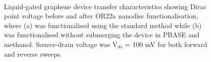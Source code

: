 \documentclass[
  a4paper,
]{scrbook}
\begin{document}
\begin{figure}
\begin{minipage}[t]{0.45\linewidth}
{{}

}

\end{minipage}%
%
\begin{minipage}[t]{0.01\linewidth}

{\centering 

~

}

\end{minipage}%

\caption{\label{fig-graphene-sensing-TX}Liquid-gated graphene device
transfer characteristics showing Dirac point voltage before and after
OR22a nanodisc functionalisation, where (a) was functionalised using the
standard method while (b) was functionalised without submerging the
device in PBASE and methanol. Source-drain voltage was V\(_{ds}\) = 100
mV for both forward and reverse sweeps.}

\end{figure}
\end{document}
